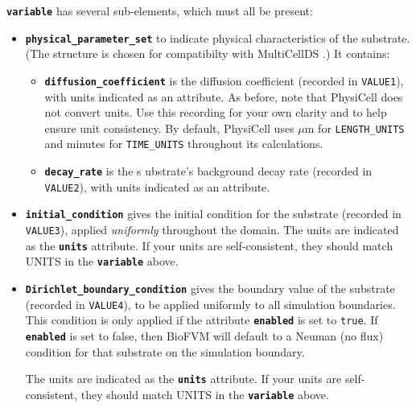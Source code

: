 \documentclass[12pt]{article}
\newcommand{\micron}{\mu\textrm{m}}
\newcommand{\smallcode}[1]{\textbf{\texttt{#1}}}
\begin{document}
\smallcode{variable} has several sub-elements, which must all be present:  
\begin{itemize} 
\item \smallcode{physical\_parameter\_set} to indicate physical characteristics of the 
substrate. (The structure is chosen for compatibilty with MultiCellDS \cite{ref:MultiCellDS}.) It contains: 
\begin{itemize}
\item \smallcode{diffusion\_coefficient} is the diffusion coefficient (recorded in \verb+VALUE1+), with units 
indicated as an attribute. As before, note that PhysiCell does not convert units. Use this recording for your 
own clarity and to help ensure unit consistency. By default, PhysiCell uses $\micron$ for \verb+LENGTH_UNITS+ 
and minutes for \verb+TIME_UNITS+ throughout its calculations. 

\item \smallcode{decay\_rate} is the s
ubstrate's background decay rate (recorded in \verb+VALUE2+), 
with units indicated as an attribute. 
\end{itemize}

\item \smallcode{initial\_condition} gives the initial condition for the substrate (recorded in 
\verb+VALUE3+), applied \emph{uniformly} throughout the domain. The units are indicated as the 
\smallcode{units} attribute. If your units are self-consistent, they should match UNITS in the \smallcode{variable} above.

\item \smallcode{Dirichlet\_boundary\_condition} gives the boundary value of the substrate 
(recorded in \verb+VALUE4+), to be applied uniformly to all simulation boundaries. 
This condition is only applied 
if the attribute \smallcode{enabled} is set to \verb+true+. If \smallcode{enabled} is 
set to false, then BioFVM will default to a Neuman (no flux) condition for that substrate 
on the simulation boundary. 

The units are indicated as the \smallcode{units} attribute. 
If your units are self-consistent, they should match UNITS in the \smallcode{variable} above.
\end{itemize}
\end{document}
